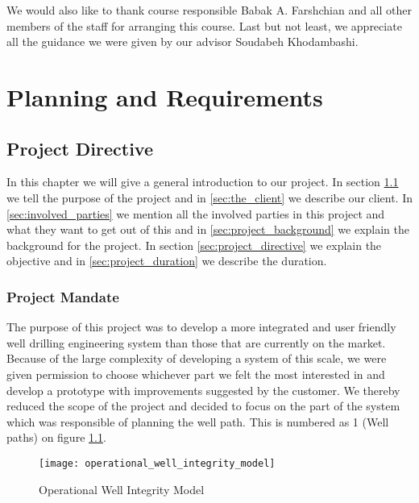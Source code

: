\documentclass{report}
\begin{document}
We would also like to thank course responsible Babak A. Farshchian and all other members of the staff for arranging this course. Last but not least, we appreciate all the guidance we were given by our advisor Soudabeh Khodambashi.


\tableofcontents
{}
\listoffigures
{}
\listoftables
{}
\clearpage

\part{Planning and Requirements}

\chapter{Project Directive} \label{cha:project_directive}
In this chapter we will give a general introduction to our project. In section \ref{sec:project_mandate} we tell the purpose of the project and in \ref{sec:the_client} we describe our client. In \ref{sec:involved_parties} we mention all the involved parties in this project and what they want to get out of this and in \ref{sec:project_background} we explain the background for the project. In section \ref{sec:project_directive} we explain the objective and in \ref{sec:project_duration} we describe the duration.

\newpage
\section{Project Mandate} \label{sec:project_mandate}
The purpose of this project was to develop a more integrated and user friendly well drilling engineering system than those that are currently on the market. Because of the large complexity of developing a system of this scale, we were given permission to choose whichever part we felt the most interested in and develop a prototype with improvements suggested by the customer. We thereby reduced the scope of the project and decided to focus on the part of the system which was responsible of planning the well path. This is numbered as 1 (Well paths) on figure \ref{fig:owim}.

\begin{figure}
    \centering
    \texttt{[image: operational\_well\_integrity\_model]}
    \caption{Operational Well Integrity Model \label{fig:owim}}
\end{figure}
\end{document}

